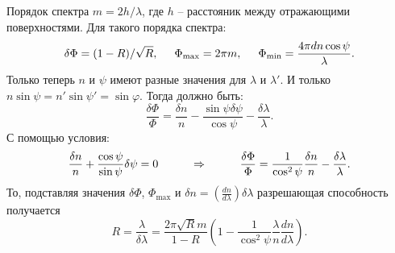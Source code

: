 Порядок спектра $m = 2 h/\lambda$, где $h$ -- расстояник между отражающими поверхностями. Для такого порядка спектра:
\begin{equation*}
    \delta\Phi = (1-R)/\sqrt{R},
    \hspace{0.5 cm}
    \Phi_{\text{max}} = 2 \pi m,
    \hspace{0.5 cm}
    \Phi_{\text{min}} = \frac{4 \pi d n \cos \psi}{\lambda}.
\end{equation*}
Только теперь $n$ и $\psi$ имеют разные значения для $\lambda$ и $\lambda'$. И только $n\sin \psi = n' \sin \psi' = \sin \varphi$. Тогда должно быть:
\begin{equation*}
    \frac{\delta \Phi}{\Phi} = \frac{\delta n}{n} - \frac{\sin \psi \delta \psi}{\cos \psi}- \frac{\delta \lambda}{\lambda}.
\end{equation*}
С помощью условия:
\begin{equation*}
    \frac{\delta n}{n} + \frac{\cos \psi}{\sin \psi} \delta \psi = 0
    \hspace{1 cm}
    \Rightarrow
    \hspace{1 cm}
    \frac{\delta \Phi}{\Phi} = \frac{1}{\cos^2 \psi}\frac{\delta n}{n} - \frac{\delta \lambda}{\lambda}.
\end{equation*}
То, подставляя значения $\delta \Phi$, $\Phi_{\text{max}}$ и $\delta n = \left(\frac{d n}{d \lambda}\right) \delta \lambda$ разрешающая способность получается
\begin{equation*}
    R = \frac{\lambda}{\delta\lambda} = \frac{2 \pi \sqrt{R} m}{1 - R}\left(1 - \frac{1}{\cos^2 \psi} \frac{\lambda}{n} \frac{d n}{d \lambda}\right).
\end{equation*}